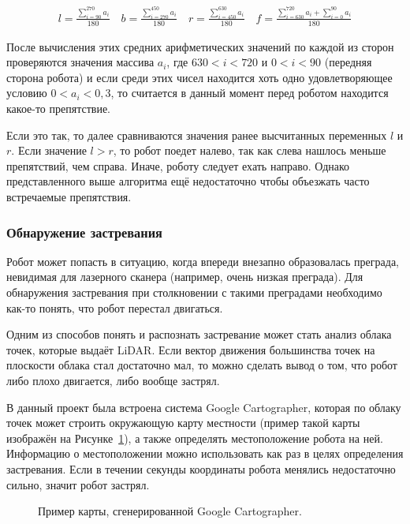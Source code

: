 \[
\begin{array}{c}
l = \frac{\displaystyle\sum_{i=90}^{270} a_i}{180} \quad
b = \frac{\displaystyle\sum_{i=270}^{450} a_i}{180}\quad
r = \frac{\displaystyle\sum_{i=450}^{630} a_i}{180} \quad
f = \frac{\displaystyle\sum_{i=630}^{720} a_i + \sum_{i=0}^{90} a_i}{180}
\end{array}
\]

После вычисления этих средних арифметических значений по каждой из сторон проверяются значения массива $a_i$, где $630 < i < 720$ и $0 < i < 90$ (передняя сторона робота) и если среди этих чисел находится хоть одно удовлетворяющее условию $0 < a_i < 0,3$, то считается в данный момент перед роботом находится какое-то препятствие.

Если это так, то далее сравниваются значения ранее высчитанных переменных $l$ и $r$. Если значение $l > r$, то робот поедет налево, так как слева нашлось меньше препятствий, чем справа. Иначе, роботу следует ехать направо. Однако представленного выше алгоритма ещё недостаточно чтобы объезжать часто встречаемые препятствия. 

\subsubsection{Обнаружение застревания}

Робот может попасть в ситуацию, когда впереди внезапно образовалась преграда, невидимая для лазерного сканера (например, очень низкая преграда). Для обнаружения застревания при столкновении с такими преградами необходимо как-то понять, что робот перестал двигаться. 

Одним из способов понять и распознать застревание может стать анализ облака точек, которые выдаёт LiDAR. Если вектор движения большинства точек на плоскости облака стал достаточно мал, то можно сделать вывод о том, что робот либо плохо двигается, либо вообще застрял. 

В данный проект была встроена система Google Cartographer, которая по облаку точек может строить окружающую карту местности (пример такой карты изображён на Рисунке~\ref{fig:cartographer-example}), а также определять местоположение робота на ней\cite[с. 1]{45466}. Информацию о местоположении можно использовать как раз в целях определения застревания. Если в течении секунды координаты робота менялись недостаточно сильно, значит робот застрял.

\begin{figure}[ht]
  \caption{Пример карты, сгенерированной Google Cartographer.}\label{fig:cartographer-example}
\end{figure}

